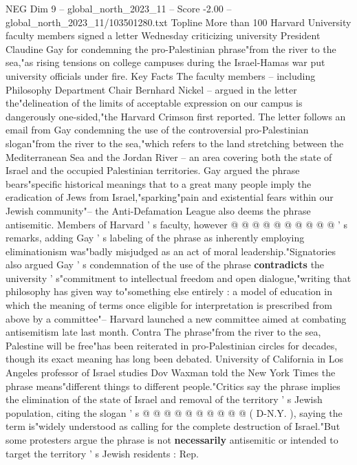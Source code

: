 \begin{textsample}{NEG Dim 9 – global\_north\_2023\_11 – Score -2.00 – global\_north\_2023\_11/103501280.txt}  \label{ex:f9_neg_299}
Topline More than 100 Harvard University faculty members signed a letter Wednesday criticizing university President Claudine Gay for condemning the pro-Palestinian phrase"from the river to the sea,"as rising tensions on college campuses during the Israel-Hamas war put university officials under fire.
Key Facts The faculty members -- including Philosophy Department Chair Bernhard Nickel -- argued in the letter the"delineation of the limits of acceptable expression on our campus is dangerously one-sided,"the Harvard Crimson first reported.
The letter follows an email from Gay condemning the use of the controversial pro-Palestinian slogan"from the river to the sea,"which refers to the land stretching between the Mediterranean Sea and the Jordan River -- an area covering both the state of Israel and the occupied Palestinian territories.
Gay argued the phrase bears"specific historical meanings that to a great many people imply the eradication of Jews from Israel,"sparking"pain and existential fears within our Jewish community"-- the Anti-Defamation League also deems the phrase antisemitic.
Members of Harvard ' s faculty, however @ @ @ @ @ @ @ @ @ @ ' s remarks, adding Gay ' s labeling of the phrase as inherently employing eliminationism was"badly misjudged as an act of moral leadership."Signatories also argued Gay ' s condemnation of the use of the phrase \textbf{contradicts} the university ' s"commitment to intellectual freedom and open dialogue,"writing that philosophy has given way to"something else entirely : a model of education in which the meaning of terms once eligible for interpretation is prescribed from above by a committee"-- Harvard launched a new committee aimed at combating antisemitism late last month.
Contra The phrase"from the river to the sea, Palestine will be free"has been reiterated in pro-Palestinian circles for decades, though its exact meaning has long been debated.
University of California in Los Angeles professor of Israel studies Dov Waxman told the New York Times the phrase means"different things to different people."Critics say the phrase implies the elimination of the state of Israel and removal of the territory ' s Jewish population, citing the slogan ' s @ @ @ @ @ @ @ @ @ @ ( D-N.Y. ), saying the term is"widely understood as calling for the complete destruction of Israel."But some protesters argue the phrase is not \textbf{necessarily} antisemitic or intended to target the territory ' s Jewish residents : Rep.

\end{textsample}
